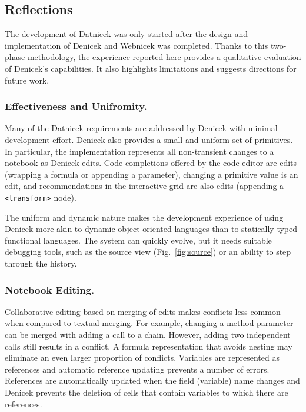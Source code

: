 \documentclass[sigconf,anonymous,screen]{acmart}
\begin{document}
\subsection{Reflections}
\label{sec:case-reflection}

The development of Datnicek was only started after the design and implementation of Denicek and
Webnicek was completed. Thanks to this two-phase methodology, the experience reported here
provides a qualitative evaluation of Denicek's capabilities. It also highlights limitations and
suggests directions for future work.

\subsubsection*{Effectiveness and Unifromity.}
Many of the Datnicek requirements are addressed by Denicek with minimal development
effort. Denicek also provides a small and uniform set of primitives. In particular,
the implementation represents all non-transient changes to a notebook as Denicek edits.
Code completions offered by the code editor are edits (wrapping a formula or appending a parameter),
changing a primitive value is an edit, and recommendations in the interactive grid are also edits
(appending a {\small\Verb_<transform>_} node).

The uniform and dynamic nature makes the development experience of using Denicek more akin to dynamic
object-oriented languages than to statically-typed functional languages. The system can quickly evolve,
but it needs suitable debugging tools, such as the source view (Fig.~\ref{fig:source}) or an
ability to step through the history.


\subsubsection*{Notebook Editing.}
Collaborative editing based on merging of edits makes conflicts less common when compared to
textual merging. For example, changing a method parameter can be merged with adding a call
to a chain. However, adding two independent calls still results in a conflict. A formula
representation that avoids nesting \cite{petricek-2019-histogram} may eliminate an even larger
proportion of conflicts.
%
Variables are represented as references and automatic reference updating %
prevents a number of errors. References are automatically updated when the field (variable) name changes
and Denicek prevents the deletion of cells that contain variables to which there are references.
\end{document}
